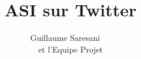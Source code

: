 \documentclass[a4paper,14pt]{article}
\title{ASI sur Twitter}
\author{Guillaume Saresani ~~\\ et l'Equipe Projet}
\begin{document}
\maketitle
\begin{center}
\end{center}
\newpage
\tableofcontents
\newpage
%
%
%
%
%
\end{document}
